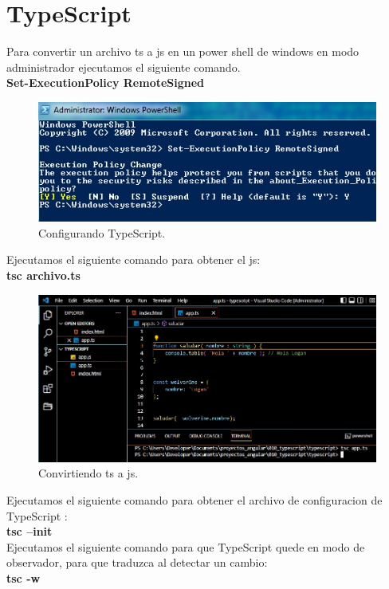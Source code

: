 \chapter{TypeScript}
Para convertir un archivo ts a js en un power shell de windows en modo administrador ejecutamos el siguiente comando.\\
\textbf{Set-ExecutionPolicy RemoteSigned}
\begin{figure}[H] 
	\centering
	\includegraphics[scale=1]{images/c2_1.jpg}
	\caption{Configurando TypeScript.}
\end{figure}

Ejecutamos el siguiente comando para obtener el js:\\
\textbf{tsc archivo.ts}\\

\begin{figure}[H] 
	\centering
	\includegraphics[scale=0.65]{images/c2_2.jpg}
	\caption{Convirtiendo ts a  js.}
\end{figure}

Ejecutamos el siguiente comando para obtener el archivo de configuracion de TypeScript :\\
\textbf{tsc --init}\\

Ejecutamos el siguiente comando para que TypeScript quede en modo de observador, para que traduzca al detectar un cambio:\\
\textbf{tsc -w}\\


